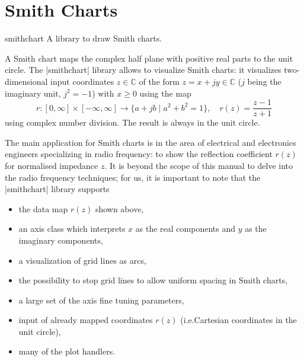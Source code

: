 
\section[libs.smithchart]{Smith Charts}
\label{sec:smithcharts}

\begingroup
\def\pgfplotsmanualcurlibrary{smithchart}

\begin{pgfplotslibrary}{smithchart}
    A library to draw Smith charts.

    A Smith chart maps the complex half plane with positive real parts to the
    unit circle. The |smithchart| library allows \PGFPlots{} to visualize Smith
    charts: it visualizes two-dimensional input coordinates $z \in \mathbb{C} $ of the
    form $z = x+ j y \in \mathbb{C}$ ($j$ being the imaginary unit, $j^2=-1$) with $x
    \ge 0$ using the map
        \[
            r\colon [0,\infty] \times [-\infty,\infty] \to
                \{ a+j b \;\vert\;  a^2 + b^2 = 1 \},
                    \quad r(z) = \frac{z-1}{z+1}
        \]
    using complex number division. The result is always in the unit circle.

    The main application for Smith charts is in the area of electrical and
    electronics engineers specializing in radio frequency: to show the
    reflection coefficient $r(z)$ for normalised impedance $z$. It is beyond
    the scope of this manual to delve into the radio frequency techniques; for
    us, it is important to note that the |smithchart| library supports
    \begin{itemize}
        \item the data map $r(z)$ shown above,
        \item an axis class which interprets $x$ as the real components and
            $y$ as the imaginary components,
        \item a visualization of grid lines as arcs,
        \item the possibility to stop grid lines to allow uniform spacing in
            Smith charts,
        \item a large set of the \PGFPlots{} axis fine tuning parameters,
        \item input of already mapped coordinates $r(z)$ (i.e.\@ Cartesian
            coordinates in the unit circle),
        \item many of the \PGFPlots{} plot handlers.
    \end{itemize}
\end{pgfplotslibrary}


